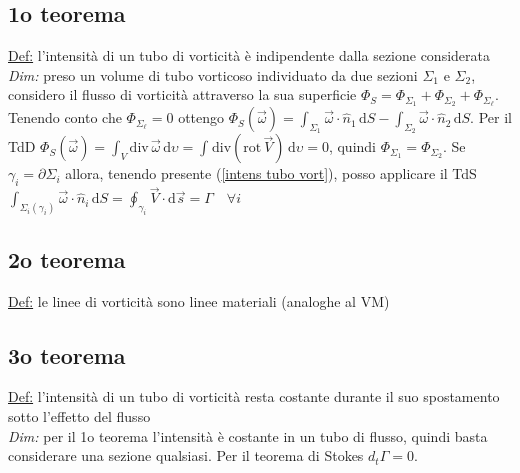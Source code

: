\documentclass[11pt,a4paper]{report}
\newcommand{\de}{\mathrm d}
\begin{document}
		\subsection{1o teorema}
		\underline{Def:} l'intensità di un tubo di vorticità è indipendente dalla sezione considerata\\
		\textit{Dim:} preso un volume di tubo vorticoso individuato da due sezioni $\Sigma_1$ e $\Sigma_2$, considero il flusso di vorticità attraverso la sua superficie $\Phi_S=\Phi_{\Sigma_1}+\Phi_{\Sigma_2}+\Phi_{\Sigma_\ell}$. Tenendo conto che $\Phi_{\Sigma_\ell}=0$ ottengo $\Phi_S(\vec\omega)=\int_{\Sigma_1}\vec\omega\cdot\hat n_1\,\de S-\int_{\Sigma_2}\vec\omega\cdot\hat n_2\,\de S$. Per il TdD $\Phi_S(\vec\omega)=\int_V\mathrm{div}\,\vec\omega\,\de \upsilon=\int_{}\mathrm{div}(\mathrm{rot}\,\vec V)\,\de \upsilon=0$, quindi $\Phi_{\Sigma_1}=\Phi_{\Sigma_2}$. Se $\gamma_i=\partial\Sigma_i$ allora, tenendo presente (\ref{intens tubo vort}), posso applicare il TdS $\int_{\Sigma_i(\gamma_i)}\vec\omega\cdot\hat n_i\,\de S=\oint_{\gamma_i}\vec V\cdot\de \vec s=\Gamma\quad\forall i$
		\subsection{2o teorema}
		\underline{Def:} le linee di vorticità sono linee materiali (analoghe al VM)
		\subsection{3o teorema}	\label{3 helm}
		\underline{Def:} l'intensità di un tubo di vorticità resta costante durante il suo spostamento sotto l'effetto del flusso\\
		\textit{Dim:} per il 1o teorema l'intensità è costante in un tubo di flusso, quindi basta considerare una sezione qualsiasi. Per il teorema di Stokes $d_t\Gamma=0$.
		
\end{document}
